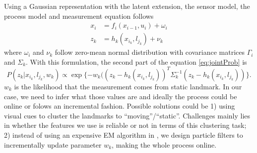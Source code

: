 Using a Gaussian representation with the latent extension, the sensor
model, the process model and measurement equation follows
\begin{equation}
\begin{aligned}
x_i &= f_i(x_{i-1}, u_i) + \omega_i \\
z_k &= h_k(x_{i_k}, l_{j_k}) + \nu_k
\end{aligned}
\end{equation}
where $\omega_i$ and $\nu_k$ follow zero-mean normal distribution with covariance matrices $\Gamma_i$ and $\Sigma_k$. With this formulation, the second part of the equation \ref{eq:jointProb} is
\begin{equation}
P(z_k|x_{i_k}, l_{j_k}, w_k)\propto \exp\{-w_k((z_k - h_k(x_{i_k}, l_{j_k}))^T\Sigma_k^{-1}(z_k - h_k(x_{i_k}, l_{j_k}))\}.
\label{eq:sensor}
\end{equation}
$w_k$ is the likelihood that the measurement comes from static landmark. In our case, we need to infer what those values are and ideally the process could be online or folows an incremental fashion. Possible solutions could be 1) using visual cues to cluster the landmarks to ``moving''/``static''. Challenges mainly lies in whether the features we use is reliable or not in terms of this clustering task; 2) instead of using an expensive EM algorithm in \cite{rogers2010slam}, we design particle filters to incrementally update parameter $w_k$, making the whole process online.
